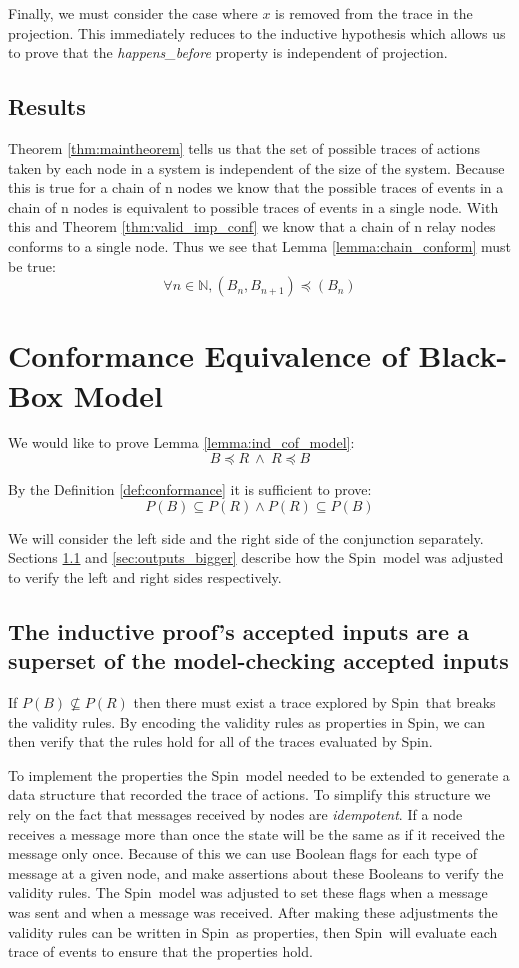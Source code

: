 \documentclass[runningheads]{llncs}
\newcommand{\spin}{Spin}
\begin{document}
Finally, we must consider the case where $x$ is removed from the trace in the projection. This immediately reduces to the inductive hypothesis which allows us to prove that the \emph{happens\_before} property is independent of projection.

\subsection{Results}
Theorem \ref{thm:maintheorem} tells us that the set of possible traces of actions taken by each node in a system is independent of the size of the system. Because this is true for a chain of n nodes we know that the possible traces of events in a chain of n nodes is equivalent to possible traces of events in a single node. With this and Theorem \ref{thm:valid_imp_conf} we know that a chain of n relay nodes conforms to a single node.
Thus we see that Lemma \ref{lemma:chain_conform} must be true:
$$\forall n \in \mathds{N}, (B_n, B_{n+1}) \preceq (B_n)
$$


\section{Conformance Equivalence of Black-Box Model}
\label{sec:inputs_map}
We would like to prove Lemma \ref{lemma:ind_cof_model}:
$$B \preceq R\ 
\wedge\ 
R \preceq B$$

By the Definition \ref{def:conformance} it is sufficient to prove:
$$P(B) \subseteq P(R) \wedge P(R) \subseteq P(B)$$

We will consider the left side and the right side of the conjunction separately. 
Sections \ref{sec:inputs_smaller} and \ref{sec:outputs_bigger} describe how the \spin\ model was adjusted to verify the left and right sides respectively.

\subsection{The inductive proof's accepted inputs are a superset of the model-checking accepted inputs}
\label{sec:inputs_smaller}
If $P(B) \nsubseteq P(R)$ then there must exist a trace explored by \spin\ that breaks the validity rules. By encoding the validity rules as properties in \spin, we can then verify that the rules hold for all of the traces evaluated by \spin. 

To implement the properties the \spin\ model needed to be extended to generate a data structure that recorded the trace of actions. To simplify this structure we rely on the fact that messages received by nodes are \emph{idempotent}. If a node receives a message more than once the state will be the same as if it received the message only once. Because of this we can use Boolean flags for each type of message at a given node, and make assertions about these Booleans to verify the validity rules. The \spin\ model was adjusted to set these flags when a message was sent and when a message was received. 
After making these adjustments the validity rules can be written in \spin\ as properties, then \spin\ will evaluate each trace of events to ensure that the properties hold. 
\end{document}
